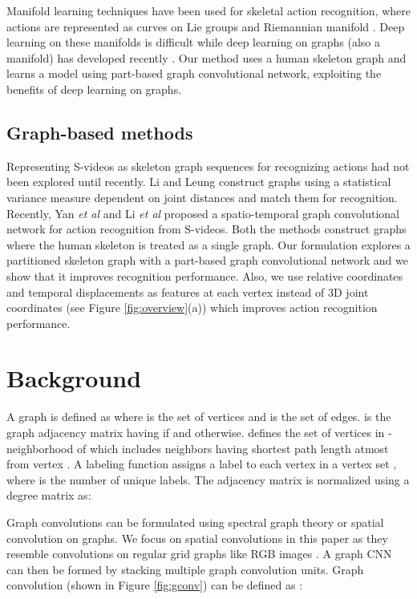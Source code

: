 \documentclass{bmvc2k}
\def\etal{\emph{et al}\bmvaOneDot}
\begin{document}
Manifold learning techniques have been used for skeletal action recognition, where actions are represented as curves on Lie groups \cite{vemulapalli2014human} and Riemannian manifold \cite{devanne20153}. Deep learning on these manifolds is difficult \cite{huang2017deep} while deep learning on graphs (also a manifold) has developed recently \cite{defferrard2016convolutional, kipf2016semi}. Our method uses a human skeleton graph and learns a model using part-based graph convolutional network, exploiting the benefits of deep learning on graphs.

\subsection{Graph-based methods}
\label{sec:2_2}
Representing S-videos as skeleton graph sequences for recognizing actions had not been explored until recently. Li and Leung \cite{li2017graph} construct graphs using a statistical variance measure dependent on joint distances and match them for recognition. Recently, Yan \etal \cite{yan2018spatial} and Li \etal \cite{li2018spatio} proposed a spatio-temporal graph convolutional network for action recognition from S-videos. Both the methods construct graphs where the human skeleton is treated as a single graph. Our formulation explores a partitioned skeleton graph with a part-based graph convolutional network and we show that it improves recognition performance. Also, we use relative coordinates and temporal displacements as features at each vertex instead of 3D joint coordinates (see Figure \ref{fig:overview}(a)) which improves action recognition performance.

\section{Background}
\label{sec:background}
A graph is defined as  where  is the set of vertices and  is the set of edges.  is the graph adjacency matrix having  if  and  otherwise.  defines the set of vertices  in -neighborhood of  which includes neighbors having shortest path length atmost  from vertex . A labeling function  assigns a label to each vertex in a vertex set , where  is the number of unique labels. The adjacency matrix is normalized using a degree matrix as:
\begingroup
\small

\endgroup
Graph convolutions can be formulated using spectral graph theory \cite{defferrard2016convolutional} or spatial convolution \cite{niepert2016learning} on graphs. We focus on spatial convolutions in this paper as they resemble convolutions on regular grid graphs like RGB images \cite{niepert2016learning}. A graph CNN can then be formed by stacking multiple graph convolution units. Graph convolution (shown in Figure \ref{fig:gconv}) can be defined as \cite{niepert2016learning}:
\begingroup
\small
\end{document}
